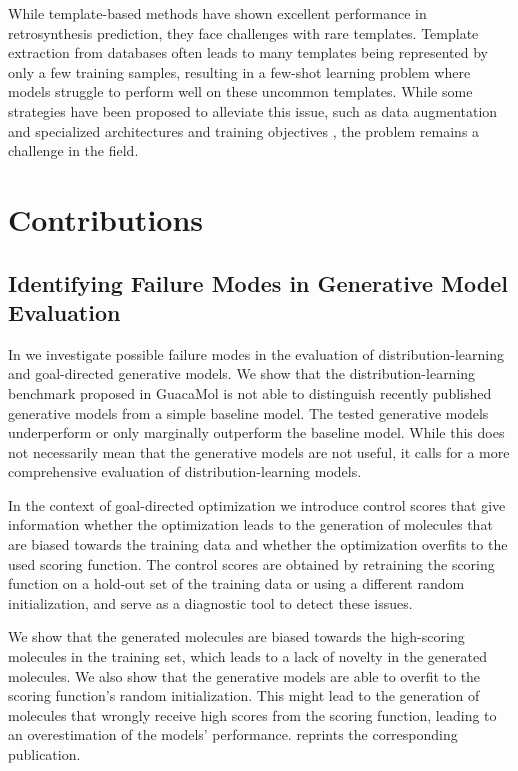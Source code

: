 While template-based methods have shown excellent performance in retrosynthesis prediction, they
face challenges with rare templates. Template extraction from databases often leads to many
templates being represented by only a few training
samples\citep{fortunatoDataAugmentationPretraining2020}, resulting in a few-shot learning problem
where models struggle to perform well on these uncommon templates. While some strategies have been
proposed to alleviate this issue, such as data augmentation
\citep{fortunatoDataAugmentationPretraining2020} and specialized architectures and training
objectives \citep{daiRetrosynthesisPredictionConditional2020}, the problem remains a challenge in
the field.

\section{Contributions\label{sec:contributions}}
\subsection{Identifying Failure Modes in Generative Model Evaluation}
In \citep{renzFailureModesMolecule2019} we investigate possible failure modes in the evaluation of
distribution-learning and goal-directed generative models. We show that the distribution-learning
benchmark proposed in GuacaMol \citep{brownGuacaMolBenchmarkingModels2019} is not able to
distinguish recently published generative models from a simple baseline model. The tested generative
models underperform or only marginally outperform the baseline model. While this does not
necessarily mean that the generative models are not useful, it calls for a more comprehensive
evaluation of distribution-learning models.

In the context of goal-directed optimization we introduce control scores that give
information whether the optimization leads to the generation of molecules that are biased towards the
training data and whether the optimization overfits to the used scoring function.
The control scores are obtained by retraining the scoring function on a hold-out set of the training
data or using a different random initialization, and serve as a diagnostic tool to
detect these issues.

We show that the generated molecules are biased towards the high-scoring molecules in the training
set, which leads to a lack of novelty in the generated molecules. We also show that the generative
models are able to overfit to the scoring function's random initialization. This might lead to the
generation of molecules that wrongly receive high scores from the scoring function, leading to an
overestimation of the models' performance.   reprints the corresponding publication.

